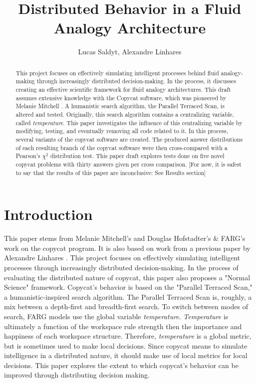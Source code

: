 \documentclass[a4paper]{article}
\title{Distributed Behavior in a Fluid Analogy Architecture}
\author{Lucas Saldyt, Alexandre Linhares}
\begin{document}
\maketitle

\begin{abstract}
    This project focuses on effectively simulating intelligent processes behind fluid analogy-making through increasingly distributed decision-making.
    In the process, it discusses creating an effective scientific framework for fluid analogy architectures.
    This draft assumes extensive knowledge with the Copycat software, which was pioneered by Melanie Mitchell \cite{analogyasperception}.
    A humanistic search algorithm, the Parallel Terraced Scan, is altered and tested.
    Originally, this search algorithm contains a centralizing variable, called \emph{temperature}.
    This paper investigates the influence of this centralizing variable by modifying, testing, and eventually removing all code related to it.
    In this process, several variants of the copycat software are created.
    The produced answer distributions of each resulting branch of the copycat software were then cross-compared with a Pearson's $\chi^2$ distribution test.
    This paper draft explores tests done on five novel copycat problems with thirty answers given per cross comparison.
    [For now, it is safest to say that the results of this paper are inconclusive: See Results section]
\end{abstract}

\section{Introduction}

This paper stems from Melanie Mitchell's \cite{analogyasperception} and Douglas Hofstadter's \& FARG's \cite{fluidconcepts} work on the copycat program.
It is also based on work from a previous paper by Alexandre Linhares \cite{linhares}.
This project focuses on effectively simulating intelligent processes through increasingly distributed decision-making.
In the process of evaluating the distributed nature of copycat, this paper also proposes a "Normal Science" framework. 
Copycat's behavior is based on the "Parallel Terraced Scan," a humanistic-inspired search algorithm.
The Parallel Terraced Scan is, roughly, a mix between a depth-first and breadth-first search.
To switch between modes of search, FARG models use the global variable \emph{temperature}.
\emph{Temperature} is ultimately a function of the workspace rule strength then the importance and happiness of each workspace structure.
Therefore, \emph{temperature} is a global metric, but is sometimes used to make local decisions.
Since copycat means to simulate intelligence in a distributed nature, it should make use of local metrics for local decisions.
This paper explores the extent to which copycat's behavior can be improved through distributing decision making.
\end{document}
